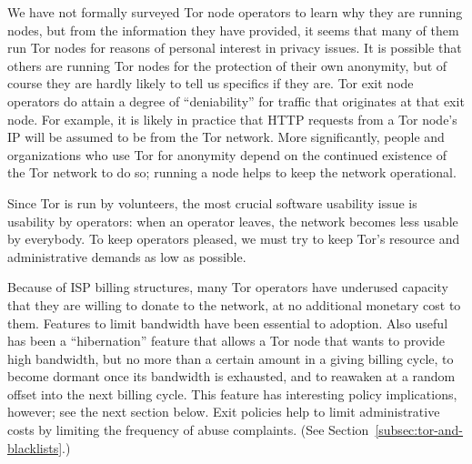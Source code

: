 \documentclass{llncs}
\begin{document}
We have not formally surveyed Tor node operators to learn why they are
running nodes, but
from the information they have provided, it seems that many of them run Tor
nodes for reasons of personal interest in privacy issues.  It is possible
that others are running Tor nodes for the protection of their own
anonymity, but of course they are
hardly likely to tell us specifics if they are.
%
Tor exit node operators do attain a degree of
``deniability'' for traffic that originates at that exit node.  For
  example, it is likely in practice that HTTP requests from a Tor node's IP
  will be assumed to be from the Tor network.
  More significantly, people and organizations who use Tor for
  anonymity depend on the
  continued existence of the Tor network to do so; running a node helps to
  keep the network operational.


Since Tor is run by volunteers, the most crucial software usability issue is
usability by operators: when an operator leaves, the network becomes less
usable by everybody.  To keep operators pleased, we must try to keep Tor's
resource and administrative demands as low as possible.

Because of ISP billing structures, many Tor operators have underused capacity
that they are willing to donate to the network, at no additional monetary
cost to them.  Features to limit bandwidth have been essential to adoption.
Also useful has been a ``hibernation'' feature that allows a Tor node that
wants to provide high bandwidth, but no more than a certain amount in a
giving billing cycle, to become dormant once its bandwidth is exhausted, and
to reawaken at a random offset into the next billing cycle.  This feature has
interesting policy implications, however; see
the next section below.
Exit policies help to limit administrative costs by limiting the frequency of
abuse complaints. (See Section~\ref{subsec:tor-and-blacklists}.)
\end{document}
